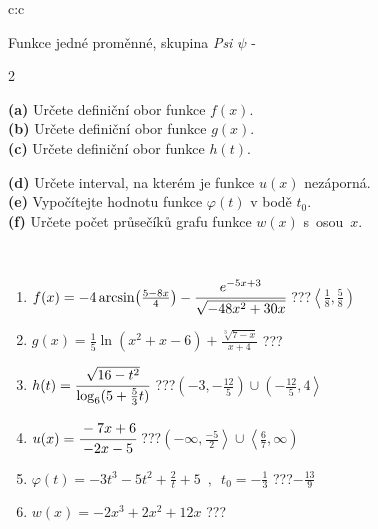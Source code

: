 \documentclass[10pt]{report}
\begin{document}
\begin{tabular}{c:c}
\begin{minipage}[c][104.5mm][t]{0.5\linewidth}
\begin{center}
\vspace{7mm}
{\huge Funkce jedné proměnné, skupina \textit{Psi $\psi$} -}\\[5mm]
\begin{minipage}{0.95\linewidth}
\begin{center}
{\small \begin{multicols}{2} \raggedright
\textbf{(a)} Určete definiční obor funkce \(f(x)\). \\[1mm]
\textbf{(b)} Určete definiční obor funkce \(g(x)\). \\[1mm]
\textbf{(c)} Určete definiční obor funkce \(h(t)\). \par \columnbreak
\textbf{(d)} Určete interval, na kterém je funkce \(u(x)\) nezáporná. \\[1mm]
\textbf{(e)} Vypočítejte hodnotu funkce \(\varphi(t)\) v bodě \(t_0\). \\[1mm]
\textbf{(f)} Určete počet průsečíků grafu funkce \(w(x)\) s~osou~\(x\). \\[1mm]
\end{multicols}
}
\end{center}
\end{minipage}
\\[4mm]
\begin{minipage}{0.79\linewidth}
\begin{center}
\begin{varwidth}{\linewidth}
\begin{enumerate}
\small
\item $f(x) = -4\arcsin\!\left( \frac{5-8x}{4} \right) - \cfrac{e^{-5x+3}}{\sqrt{-48x^2+30x}}$\quad \dotfill\; ???\;\dotfill \quad $\left\langle\frac{1}{8} , \frac{5}{8}\right)$
\item $g(x) = \frac{1}{5} \ln{\!(x^2+x-6)}+\frac{\sqrt[3]{7-x}}{x+4}$\quad \dotfill\; ???\;\dotfill {}
\item $h(t) = \cfrac{\sqrt{16-t^2}}{\log_6(5+\frac{5}{3}t)}$\quad \dotfill\; ???\;\dotfill \quad $\left(-3 , -\frac{12}{5}\right)\cup\left(-\frac{12}{5} , 4\right\rangle$
\item $u(x) = \cfrac{-7x+6}{-2x-5}$\quad \dotfill\; ???\;\dotfill \quad $\left(-\infty , \frac{-5}{2}\right\rangle\cup\left\langle\frac{6}{7} , \infty\right)$
\item $\varphi(t) = -3t^3-5t^2+\frac{2}{t}+5 \enspace , \enspace t_0=-\frac{1}{3}$\quad \dotfill\; ???\;\dotfill \quad $-\frac{13}{9}$
\item $w(x) = -2x^3+2x^2+12x$\quad \dotfill\; ???\;\dotfill {}

\end{enumerate}
\end{varwidth}
\end{center}
\end{minipage}
\end{center}
\end{minipage}
\end{tabular}
\end{document}
